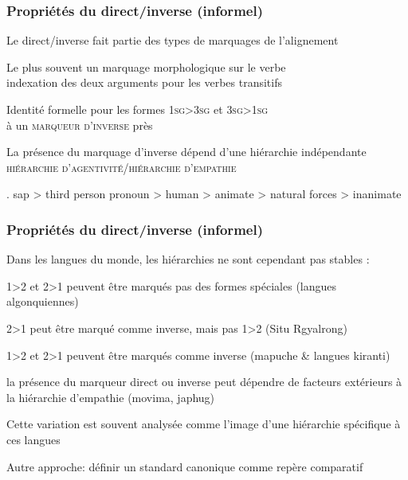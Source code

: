 \begin{frame}
\frametitle{Propriétés du direct/inverse (informel)}
\begin{blackwideitemize}
\item Le direct/inverse fait partie des types de marquages de
  l'alignement
\item Le plus souvent un marquage morphologique sur le verbe\\
\ra indexation des deux arguments pour les verbes transitifs
\item Identité formelle pour les formes \textsc{1sg>3sg} et
  \textsc{3sg>1sg}\\ à un \textsc{marqueur d'inverse} près
\item La présence du marquage d'inverse dépend d'une hiérarchie
  indépendante\\
\ra \textsc{hiérarchie d'agentivité/hiérarchie d'empathie} \cite[644]{delancey81}
\end{blackwideitemize}

\ex. {\sc sap} > third person pronoun > human > animate > natural
forces > inanimate\label{ex:delancey}

\end{frame}

\begin{frame}
\frametitle{Propriétés du direct/inverse (informel)}
\begin{blackwideitemize}
\item Dans les langues du monde, les hiérarchies ne sont cependant pas
  stables \cite{jacques13inversecompass}:
\begin{smallwideitemize}
\item \textsc{1>2} et \textsc{2>1} peuvent être marqués pas des formes
  spéciales (langues algonquiennes)
\item \textsc{2>1} peut être marqué comme inverse, mais pas \textsc{1>2} (Situ Rgyalrong)
\item \textsc{1>2} et \textsc{2>1} peuvent être marqués comme inverse
  (mapuche \& langues kiranti)
\item la présence du marqueur direct ou inverse peut dépendre de
  facteurs extérieurs à la hiérarchie d'empathie (movima, japhug)
\end{smallwideitemize}
\item Cette variation est souvent analysée comme l'image d'une
  hiérarchie spécifique à ces langues
\pause
\item Autre approche: définir un standard canonique comme repère
  comparatif 
\end{blackwideitemize}

\end{frame}

